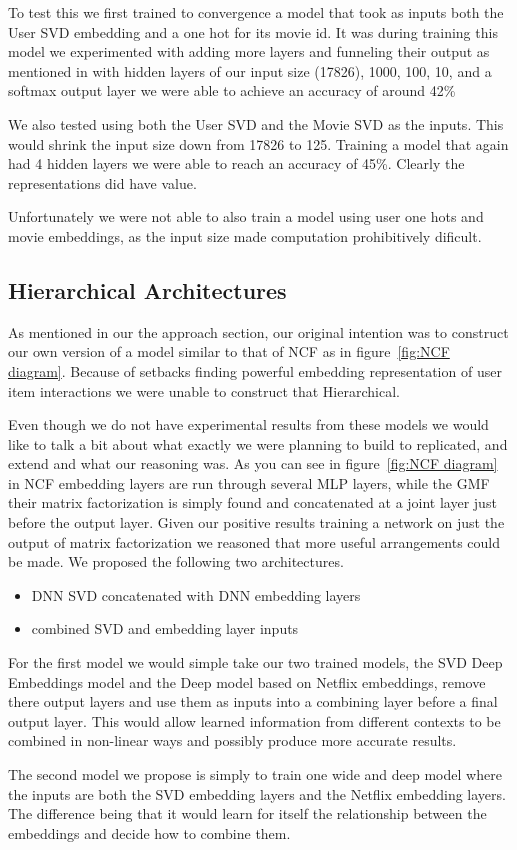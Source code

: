 To test this we first trained to convergence a model that took as inputs both the User SVD embedding and a one hot for its movie id. It was during training this model we experimented with adding more layers and funneling their output as mentioned in \cite{He2017} with hidden layers of our input size (17826), 1000, 100, 10, and a softmax output layer we were able to achieve an accuracy of around 42\%

We also tested using both the User SVD and the Movie SVD as the inputs. This would shrink the input size down from 17826 to 125. Training a model that again had 4 hidden layers we were able to reach an accuracy of 45\%. Clearly the representations did have value.

Unfortunately we were not able to also train a model using user one hots and movie embeddings, as the input size made computation prohibitively dificult. 
\subsection{Hierarchical Architectures}

As mentioned in our the approach section, our original intention was to construct our own version of a model similar to that of NCF as in figure~\ref{fig:NCF diagram}. Because of setbacks finding powerful embedding representation of user item interactions we were unable to construct that Hierarchical. 

Even though we do not have experimental results from these models we would like to talk a bit about what exactly we were planning to build to replicated, and extend \cite{He2017} and what our reasoning was. As you can see in figure~\ref{fig:NCF diagram} in NCF embedding layers are run through several MLP layers, while the GMF their matrix factorization is simply found and concatenated at a joint layer just before the output layer. Given our positive results training a network on just the output of matrix factorization we reasoned that more useful arrangements could be made. We proposed the following two architectures.

\begin{itemize}
\item DNN SVD concatenated with DNN embedding layers
\item combined SVD and embedding layer inputs
\end{itemize}

For the first model we would simple take our two trained models, the SVD Deep Embeddings model and the Deep model based on Netflix embeddings, remove there output layers and use them as inputs into a combining layer before a final output layer. This would allow learned information from different contexts to be combined in non-linear ways and possibly produce more accurate results.

The second model we propose is simply to train one wide and deep model where the inputs are both the SVD embedding layers and the Netflix embedding layers. The difference being that it would learn for itself the relationship between the embeddings and decide how to combine them.
